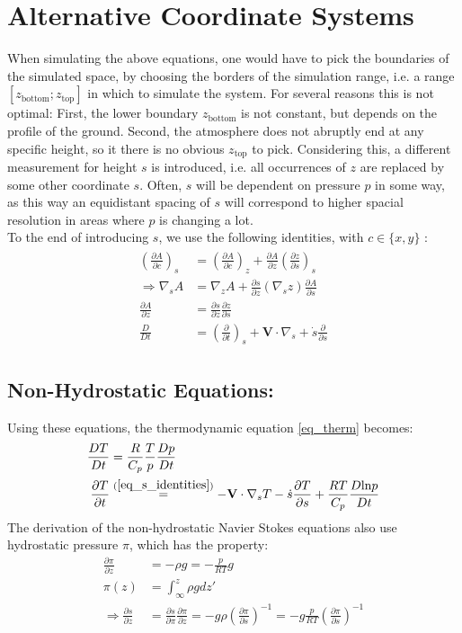 \section{Alternative Coordinate Systems}
When simulating the above equations, one would have to pick the boundaries of the simulated space, by choosing the borders of the simulation range, i.e. a range $[z_{\text{bottom}};z_{\text{top}}]$ in which to simulate the system.
For several reasons this is not optimal:
First, the lower boundary $z_{\text{bottom}}$ is not constant, but depends on the profile of the ground.
Second, the atmosphere does not abruptly end at any specific height, so it there is no obvious $z_{\text{top}}$ to pick.
Considering this, a different measurement for height $s$ is introduced, i.e. all occurrences of $z$ are replaced by some other coordinate $s$.
Often, $s$ will be dependent on pressure $p$ in some way, as this way an equidistant spacing of $s$ will correspond to higher spacial resolution in areas where $p$ is changing a lot.\\
To the end of introducing $s$, we use the following identities, with $c\in\{x,y\}$ \cite{kasahara1974various}:
\begin{align}
\begin{split}
(\frac{\partial A}{\partial c})_s &= (\frac{\partial A}{\partial c})_z + \frac{\partial A}{\partial z}(\frac{\partial z}{\partial s})_s\\
\Rightarrow \nabla _s A &= \nabla _z A+\frac{\partial s}{\partial z}(\nabla _sz)\frac{\partial A}{\partial s}\\
\frac{\partial A}{\partial z} &= \frac{\partial s}{\partial z} \frac{\partial z}{\partial s}\\
\frac{D}{Dt} &= (\frac{\partial}{\partial t})_s + \textbf{V} \cdot \nabla _s + \dot{s}\frac{\partial }{\partial s}
\end{split}\label{eq_s_identities}
\end{align}


\subsection{Non-Hydrostatic Equations:}
Using these equations, the thermodynamic equation \ref{eq_therm} becomes:
\begin{align*}
\frac{DT}{Dt} &= \frac{R}{C_p}\frac{T}{p}\frac{Dp}{Dt}\\
\frac{\partial T}{\partial t} &\stackrel{(\ref{eq_s_identities})}{=} -\textbf{V} \cdot \nabla _s T - \dot{s} \frac{\partial T}{\partial s}+\frac{RT}{C_p}\frac{D\text{ln}p}{Dt}
\end{align*}
The derivation of the non-hydrostatic Navier Stokes equations also use hydrostatic pressure $\pi$, which has the property:
\begin{align}
\frac{\partial \pi}{\partial z} &= -\rho g = - \frac{p}{RT}g \nonumber \\
\pi(z) &= \int_\infty ^z \rho g dz' \nonumber \\
\Rightarrow \frac{\partial s}{\partial z} &= \frac{\partial s}{\partial \pi}\frac{\partial \pi}{\partial z} = - g\rho(\frac{\partial \pi}{\partial s})^{-1} = - g\frac{p}{RT}(\frac{\partial \pi}{\partial s})^{-1} \label{eq_ds_dz}
\end{align}

